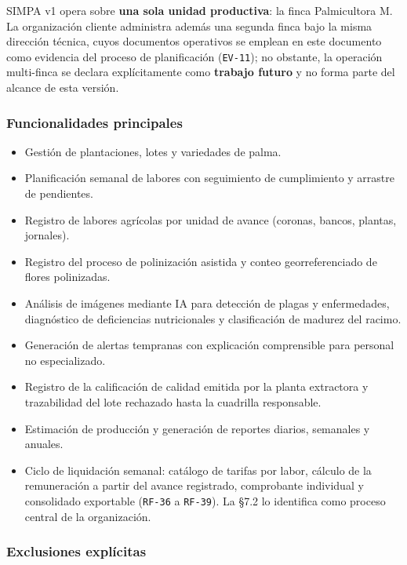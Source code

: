 \documentclass[11pt,a4paper]{article}
\newcommand{\id}[1]{\texttt{\begingroup\hyphenpenalty=10000\relax#1\endgroup}}
\renewcommand{\id}[1]{\texttt{#1}}
\begin{document}
SIMPA v1 opera sobre \textbf{una sola unidad productiva}: la finca Palmicultora M. La organización
cliente administra además una segunda finca bajo la misma dirección técnica, cuyos documentos
operativos se emplean en este documento como evidencia del proceso de planificación
(\id{EV-11}); no obstante, la operación multi-finca se declara explícitamente como
\textbf{trabajo futuro} y no forma parte del alcance de esta versión.

\subsubsection{Funcionalidades principales}

\begin{itemize}[nosep]
  \item Gestión de plantaciones, lotes y variedades de palma.
  \item Planificación semanal de labores con seguimiento de cumplimiento y arrastre de pendientes.
  \item Registro de labores agrícolas por unidad de avance (coronas, bancos, plantas, jornales).
  \item Registro del proceso de polinización asistida y conteo georreferenciado de flores polinizadas.
  \item Análisis de imágenes mediante IA para detección de plagas y enfermedades, diagnóstico de
        deficiencias nutricionales y clasificación de madurez del racimo.
  \item Generación de alertas tempranas con explicación comprensible para personal no especializado.
  \item Registro de la calificación de calidad emitida por la planta extractora y trazabilidad
        del lote rechazado hasta la cuadrilla responsable.
  \item Estimación de producción y generación de reportes diarios, semanales y anuales.
  \item Ciclo de liquidación semanal: catálogo de tarifas por labor, cálculo de la remuneración a
        partir del avance registrado, comprobante individual y consolidado exportable (\id{RF-36} a
        \id{RF-39}). La §7.2 lo identifica como proceso central de la organización.
\end{itemize}

\subsubsection{Exclusiones explícitas}
\end{document}
